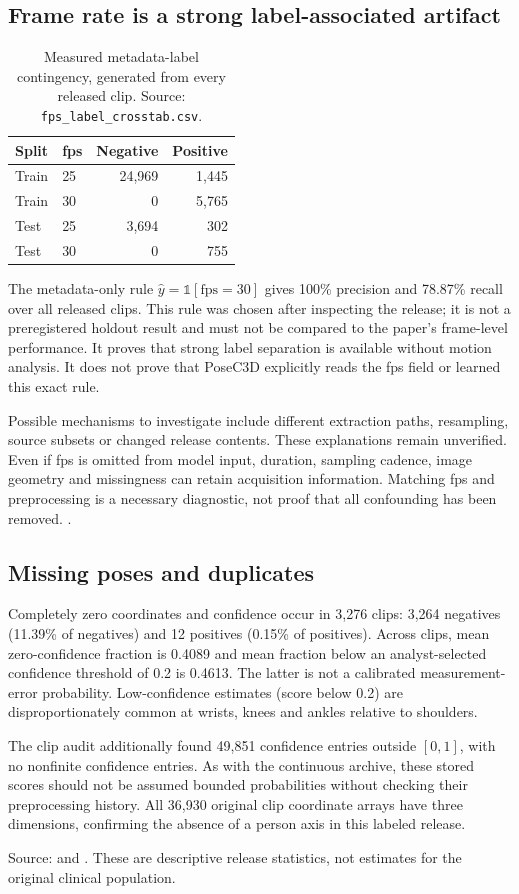 \subsection{Frame rate is a strong label-associated artifact}
\begin{table}[H]\centering
\begin{tabular}{@{}llrr@{}}\toprule
Split & fps & Negative & Positive\\\midrule
Train & 25 & 24,969 & 1,445\\
Train & 30 & 0 & 5,765\\
Test & 25 & 3,694 & 302\\
Test & 30 & 0 & 755\\\bottomrule
\end{tabular}
\caption{Measured metadata-label contingency, generated from every released clip. Source: \texttt{fps\_label\_crosstab.csv}.}
\end{table}
The metadata-only rule $\widehat y=\mathbb{1}[\mathrm{fps}=30]$ gives 100\% precision and 78.87\% recall over all released clips. This rule was chosen after inspecting the release; it is not a preregistered holdout result and must not be compared to the paper's frame-level performance. It proves that strong label separation is available without motion analysis. It does not prove that PoseC3D explicitly reads the fps field or learned this exact rule.

Possible mechanisms to investigate include different extraction paths, resampling, source subsets or changed release contents. These explanations remain unverified. Even if fps is omitted from model input, duration, sampling cadence, image geometry and missingness can retain acquisition information. Matching fps and preprocessing is a necessary diagnostic, not proof that all confounding has been removed. .

\subsection{Missing poses and duplicates}
Completely zero coordinates and confidence occur in 3,276 clips: 3,264 negatives (11.39\% of negatives) and 12 positives (0.15\% of positives). Across clips, mean zero-confidence fraction is 0.4089 and mean fraction below an analyst-selected confidence threshold of 0.2 is 0.4613. The latter is not a calibrated measurement-error probability. Low-confidence estimates (score below 0.2) are disproportionately common at wrists, knees and ankles relative to shoulders.\par
The clip audit additionally found 49,851 confidence entries outside $[0,1]$, with no nonfinite confidence entries. As with the continuous archive, these stored scores should not be assumed bounded probabilities without checking their preprocessing history. All 36,930 original clip coordinate arrays have three dimensions, confirming the absence of a person axis in this labeled release.\par
Source:  and . These are descriptive release statistics, not estimates for the original clinical population.

